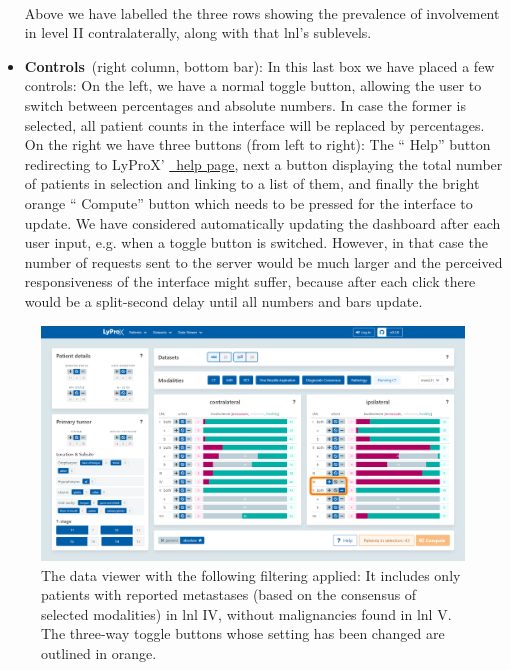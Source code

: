 \documentclass[\relativeRoot/main.tex]{subfiles}
\begin{document}
\begin{itemize}
\\
    [3mm]
    Above we have labelled the three rows showing the prevalence of involvement in level II contralaterally, along with that \gls{lnl}'s sublevels.
    \item \textbf{Controls}~(right column, bottom bar): In this last box we have placed a few controls: On the left, we have a normal toggle button, allowing the user to switch between percentages and absolute numbers. In case the former is selected, all patient counts in the interface will be replaced by percentages. On the right we have three buttons (from left to right): The `` Help'' button redirecting to LyProX' \href{https://lyprox.org/dashboard/help}{~help page}, next a button displaying the total number of patients in selection and linking to a list of them, and finally the bright orange `` Compute'' button which needs to be pressed for the interface to update. We have considered automatically updating the dashboard after each user input, e.g. when a toggle button is switched. However, in that case the number of requests sent to the server would be much larger and the perceived responsiveness of the interface might suffer, because after each click there would be a split-second delay until all numbers and bars update.
\end{itemize}

\begin{figure}
    \centering
    \includegraphics[width=1.0\textwidth, frame]{figures/data_viewer_lnl_example.png}
    \caption[
        The data viewer showing a scenario of two involved LNLs
    ]{
        The data viewer with the following filtering applied: It includes only patients with reported metastases (based on the consensus of selected modalities) in \gls{lnl} IV, without malignancies found in \gls{lnl} V. The three-way toggle buttons whose setting has been changed are outlined in orange.
    }
    \label{fig:lyprox:data_viewer_lnl_example}
\end{figure}
\end{document}
